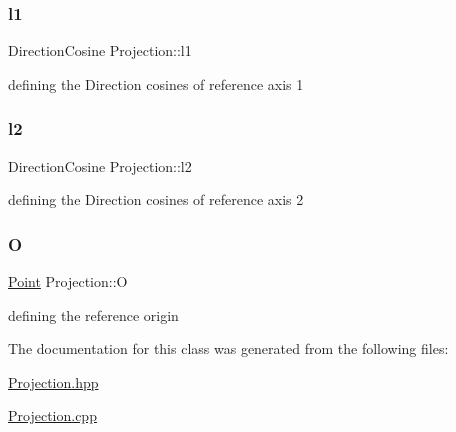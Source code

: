 \subsubsection{\texorpdfstring{l1}{l1}}
{\footnotesize\ttfamily Direction\+Cosine Projection\+::l1}



defining the Direction cosines of reference axis 1 

\mbox{\label{class_projection_a70ac3592a798a01019ec35ba2c3247ea}} 
\subsubsection{\texorpdfstring{l2}{l2}}
{\footnotesize\ttfamily Direction\+Cosine Projection\+::l2}



defining the Direction cosines of reference axis 2 

\mbox{\label{class_projection_a9400a70d8820176f4731eae11fce8ca2}} 
\subsubsection{\texorpdfstring{O}{O}}
{\footnotesize\ttfamily \mbox{\hyperlink{class_point}{Point}} Projection\+::O}



defining the reference origin 



The documentation for this class was generated from the following files\+:\begin{DoxyCompactItemize}
\item 
\mbox{\hyperlink{_projection_8hpp}{Projection.\+hpp}}\item 
\mbox{\hyperlink{_projection_8cpp}{Projection.\+cpp}}\end{DoxyCompactItemize}
